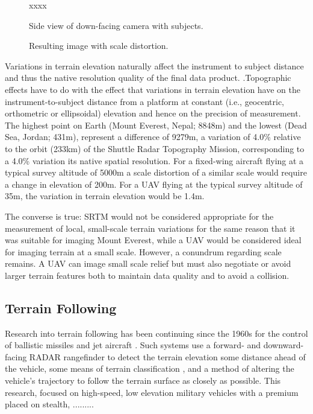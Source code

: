 \documentclass[10pt,a4paper]{report}
\begin{document}
\begin{figure}
xxxx
\caption{Side view of down-facing camera with subjects.}
\label{fig:scale_cam}
\end{figure}

\begin{figure}
\caption{Resulting image with scale distortion.}
\label{fig:scale_img}
\end{figure}


Variations in terrain elevation naturally affect the instrument to subject distance and thus the native resolution quality of the final data product. .Topographic effects have to do with the effect that variations in terrain elevation have on the instrument-to-subject distance from a platform at constant (i.e., geocentric, orthometric or ellipsoidal) elevation and hence on the precision of measurement. The highest point on Earth (Mount Everest, Nepal; 8848m) and the lowest (Dead Sea, Jordan; 431m), represent a difference of 9279m, a variation of 4.0\% relative to the orbit (233km) of the  Shuttle Radar Topography Mission, corresponding to a 4.0\% variation its native spatial resolution. For a fixed-wing aircraft flying at a typical survey altitude of 5000m a scale distortion of a similar scale would require a change in elevation of 200m. For a UAV flying at the typical survey altitude of 35m, the variation in terrain elevation would be 1.4m.

The converse is true: SRTM would not be considered appropriate for the measurement of local, small-scale terrain variations for the same reason that it was suitable for imaging Mount Everest, while a UAV would be considered ideal for imaging terrain at a small scale. However, a conundrum regarding scale remains. A UAV can image small scale relief but must also negotiate or avoid larger terrain features both to maintain data quality and to avoid a collision.


\subsection{Terrain Following}

Research into terrain following has been continuing since the 1960s for the control of ballistic missiles and jet aircraft \cite{KRACHMALNICK1968,Starling1971,Cunningham1980}. Such systems use a forward- and downward-facing RADAR rangefinder to detect the terrain elevation some distance ahead of the vehicle, some means of terrain classification \cite{Cunningham1980}, and a method of altering the vehicle's trajectory to follow the terrain surface as closely as possible. This research, focused on high-speed, low elevation military vehicles with a premium placed on stealth, .........
\end{document}
